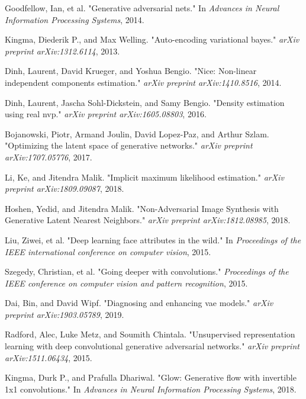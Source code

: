 \documentclass{article}
\begin{document}

\newpage
\begin{thebibliography}{9}
    Goodfellow, Ian, et al. "Generative adversarial nets." In \textit{Advances in Neural Information Processing Systems}, 2014.

    Kingma, Diederik P., and Max Welling. "Auto-encoding variational bayes." \textit{arXiv preprint arXiv:1312.6114}, 2013.

    Dinh, Laurent, David Krueger, and Yoshua Bengio. "Nice: Non-linear independent components estimation." \textit{arXiv preprint arXiv:1410.8516}, 2014.

    Dinh, Laurent, Jascha Sohl-Dickstein, and Samy Bengio. "Density estimation using real nvp." \textit{arXiv preprint arXiv:1605.08803}, 2016.
    
    Bojanowski, Piotr, Armand Joulin, David Lopez-Paz, and Arthur Szlam. "Optimizing the latent space of generative networks." \textit{arXiv preprint arXiv:1707.05776}, 2017.
    
   Li, Ke, and Jitendra Malik. "Implicit maximum likelihood estimation." \textit{arXiv preprint arXiv:1809.09087}, 2018.

   Hoshen, Yedid, and Jitendra Malik. "Non-Adversarial Image Synthesis with Generative Latent Nearest Neighbors." \textit{arXiv preprint arXiv:1812.08985}, 2018.

   Liu, Ziwei, et al. "Deep learning face attributes in the wild." In \textit{Proceedings of the IEEE international conference on computer vision}, 2015.

  Szegedy, Christian, et al. "Going deeper with convolutions." \textit{Proceedings of the IEEE conference on computer vision and pattern recognition}, 2015.

  Dai, Bin, and David Wipf. "Diagnosing and enhancing vae models." \textit{arXiv preprint arXiv:1903.05789}, 2019.

    Radford, Alec, Luke Metz, and Soumith Chintala. "Unsupervised representation learning with deep convolutional generative adversarial networks." \textit{arXiv preprint arXiv:1511.06434}, 2015.

    Kingma, Durk P., and Prafulla Dhariwal. "Glow: Generative flow with invertible 1x1 convolutions." In \textit{Advances in Neural Information Processing Systems}, 2018.


\end{thebibliography}
\end{document}
